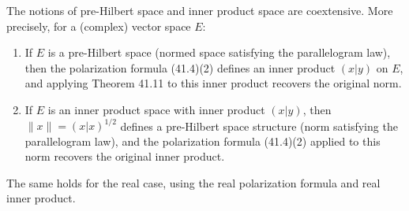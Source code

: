 The notions of pre-Hilbert space and inner product space are coextensive. More precisely, for a (complex) vector space $E$:

\begin{enumerate}
\item[(i)] If $E$ is a pre-Hilbert space (normed space satisfying the parallelogram law), then the polarization formula (41.4)(2) defines an inner product $(x|y)$ on $E$, and applying Theorem 41.11 to this inner product recovers the original norm.

\item[(ii)] If $E$ is an inner product space with inner product $(x|y)$, then $\|x\| = (x|x)^{1/2}$ defines a pre-Hilbert space structure (norm satisfying the parallelogram law), and the polarization formula (41.4)(2) applied to this norm recovers the original inner product.
\end{enumerate}

The same holds for the real case, using the real polarization formula and real inner product.
